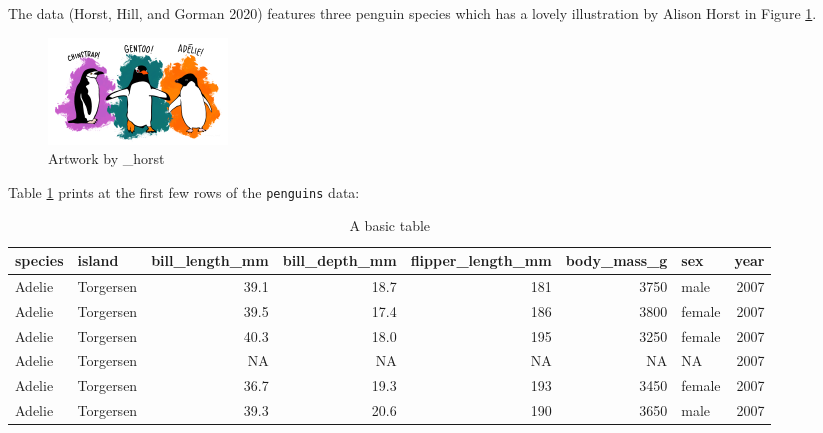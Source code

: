 The  data (Horst, Hill, and Gorman 2020) features three penguin species which has a lovely illustration by Alison Horst in Figure \ref{fig:penguins-alison}.

\begin{figure}
\includegraphics[width=1\linewidth,height=0.3\textheight]{figures/penguins} \caption{Artwork by \@allison\_horst}\label{fig:penguins-alison}
\end{figure}

Table \ref{tab:penguins-tab-static} prints at the first few rows of the \texttt{penguins} data:

\begin{table}

\caption{\label{tab:penguins-tab-static}A basic table}
\centering
\fontsize{7}{9}\selectfont
\begin{tabular}[t]{l|l|r|r|r|r|l|r}
\hline
species & island & bill\_length\_mm & bill\_depth\_mm & flipper\_length\_mm & body\_mass\_g & sex & year\\
\hline
Adelie & Torgersen & 39.1 & 18.7 & 181 & 3750 & male & 2007\\
\hline
Adelie & Torgersen & 39.5 & 17.4 & 186 & 3800 & female & 2007\\
\hline
Adelie & Torgersen & 40.3 & 18.0 & 195 & 3250 & female & 2007\\
\hline
Adelie & Torgersen & NA & NA & NA & NA & NA & 2007\\
\hline
Adelie & Torgersen & 36.7 & 19.3 & 193 & 3450 & female & 2007\\
\hline
Adelie & Torgersen & 39.3 & 20.6 & 190 & 3650 & male & 2007\\
\hline
\end{tabular}
\end{table}


